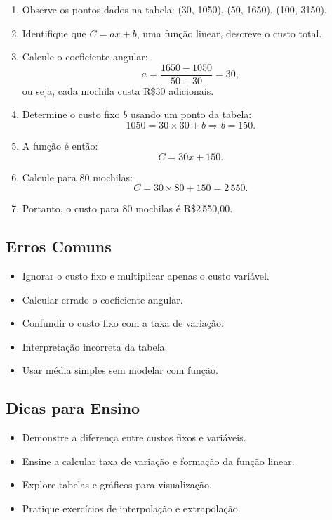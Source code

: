 \documentclass{article}
\begin{document}
\begin{enumerate}
  \item Observe os pontos dados na tabela: (30, 1050), (50, 1650), (100, 3150).
  \item Identifique que $C = ax + b$, uma função linear, descreve o custo total.
  \item Calcule o coeficiente angular:
  \[
  a = \frac{1650 - 1050}{50 - 30} = 30,
  \]
  ou seja, cada mochila custa R\$30 adicionais.
  \item Determine o custo fixo $b$ usando um ponto da tabela:
  \[
  1050 = 30 \times 30 + b \Rightarrow b = 150.
  \]
  \item A função é então:
  \[
  C = 30x + 150.
  \]
  \item Calcule para 80 mochilas:
  \[
  C = 30 \times 80 + 150 = 2\,550.
  \]
  \item Portanto, o custo para 80 mochilas é R\$2\,550,00.
\end{enumerate}

\subsection*{Erros Comuns}

\begin{itemize}
  \item Ignorar o custo fixo e multiplicar apenas o custo variável.
  \item Calcular errado o coeficiente angular.
  \item Confundir o custo fixo com a taxa de variação.
  \item Interpretação incorreta da tabela.
  \item Usar média simples sem modelar com função.
\end{itemize}

\subsection*{Dicas para Ensino}

\begin{itemize}
  \item Demonstre a diferença entre custos fixos e variáveis.
  \item Ensine a calcular taxa de variação e formação da função linear.
  \item Explore tabelas e gráficos para visualização.
  \item Pratique exercícios de interpolação e extrapolação.
\end{itemize}
\end{document}
